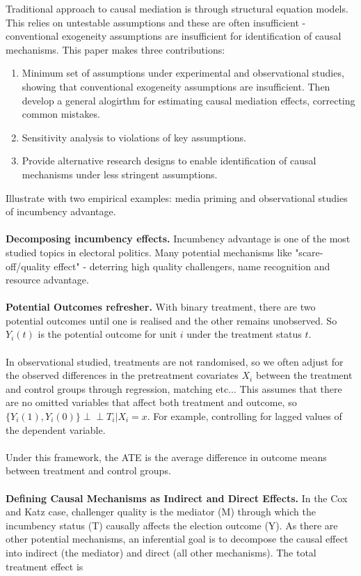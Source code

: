 \documentclass{article}
\newcommand{\indep}{\perp\!\!\!\!\perp}
\begin{document}
	Traditional approach to causal mediation is through structural equation models. This relies on untestable assumptions and these are often insufficient - conventional exogeneity assumptions are insufficient for identification of causal mechanisms. This paper makes three contributions:
	\begin{enumerate}
		\item Minimum set of assumptions under experimental and observational studies, showing that conventional exogeneity assumptions are insufficient. Then develop a general alogirthm for estimating causal mediation effects, correcting common mistakes. 
		\item Sensitivity analysis to violations of key assumptions. 
		\item Provide alternative research designs to enable identification of causal mechanisms under less stringent assumptions. 
	\end{enumerate}
	Illustrate with two empirical examples: media priming and observational studies of incumbency advantage. 
	\\~\\
	\textbf{Decomposing incumbency effects.} Incumbency advantage is one of the most studied topics in electoral politics. Many potential mechanisms like "scare-off/quality effect" - deterring high quality challengers, name recognition and resource advantage. 
	\\~\\
	\textbf{Potential Outcomes refresher.} With binary treatment, there are two potential outcomes until one is realised and the other remains unobserved. So $Y_i(t)$ is the potential outcome for unit $i$ under the treatment status $t$. 
	\\~\\
	In observational studied, treatments are not randomised, so we often adjust for the observed differences in the pretreatment covariates $X_i$ between the treatment and control groups through regression, matching etc... This assumes that there are no omitted variables that affect both treatment and outcome, so $\{Y_i(1), Y_i(0)\} \indep T_i | X_i = x$. For example, controlling for lagged values of the dependent variable.
	\\~\\
	Under this framework, the ATE is the average difference in outcome means between treatment and control groups. 
	\\~\\
	\textbf{Defining Causal Mechanisms as Indirect and Direct Effects.} In the Cox and Katz case, challenger quality is the mediator (M) through which the incumbency status (T) causally affects the election outcome (Y). As there are other potential mechanisms, an inferential goal is to decompose the causal effect into indirect (the mediator) and direct (all other mechanisms). The total treatment effect is
\end{document}

